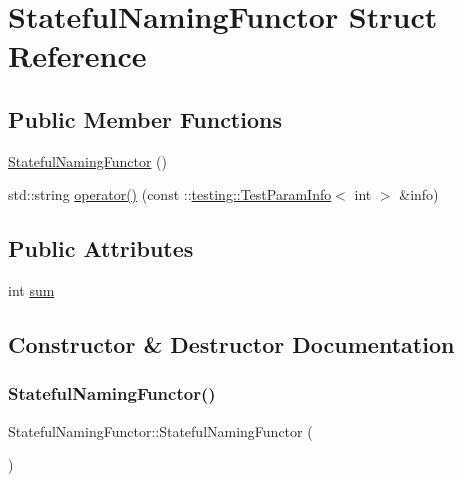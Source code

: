 \hypertarget{structStatefulNamingFunctor}{}\section{Stateful\+Naming\+Functor Struct Reference}
\label{structStatefulNamingFunctor}
\subsection*{Public Member Functions}
\begin{DoxyCompactItemize}
\item 
\mbox{\hyperlink{structStatefulNamingFunctor_a5ad1bfb327a44d58aafa96e4e2490a36}{Stateful\+Naming\+Functor}} ()
\item 
std\+::string \mbox{\hyperlink{structStatefulNamingFunctor_a6a1d07c0b8314c1aee535f269ea536db}{operator()}} (const \+::\mbox{\hyperlink{structtesting_1_1TestParamInfo}{testing\+::\+Test\+Param\+Info}}$<$ int $>$ \&info)
\end{DoxyCompactItemize}
\subsection*{Public Attributes}
\begin{DoxyCompactItemize}
\item 
int \mbox{\hyperlink{structStatefulNamingFunctor_a95887cf031d3113ae2edcd7617af3b79}{sum}}
\end{DoxyCompactItemize}


\subsection{Constructor \& Destructor Documentation}
\mbox{\label{structStatefulNamingFunctor_a5ad1bfb327a44d58aafa96e4e2490a36}} 
\subsubsection{\texorpdfstring{StatefulNamingFunctor()}{StatefulNamingFunctor()}}
{\footnotesize\ttfamily Stateful\+Naming\+Functor\+::\+Stateful\+Naming\+Functor (\begin{DoxyParamCaption}{ }\end{DoxyParamCaption})\hspace{0.3cm}{\ttfamily [inline]}}



